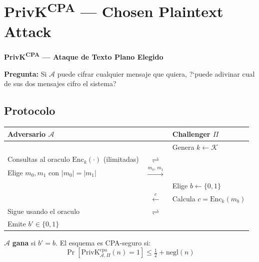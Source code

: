 \documentclass[a4paper,11pt]{article}
\begin{document}
\section{PrivK\textsuperscript{CPA} --- Chosen Plaintext Attack}

\begin{tcolorbox}[
  enhanced, breakable,
  colback=white, colframe=itbaGreen,
  borderline west={3pt}{0pt}{itbaGreen},
  sharp corners, drop shadow,
  top=4mm, left=4mm, right=4mm, bottom=4mm,
]
{\color{itbaGreen}\large\bfseries PrivK\textsuperscript{CPA} --- Ataque de Texto Plano Elegido}\par\vspace{4pt}
\textbf{Pregunta:} Si $\mathcal{A}$ puede cifrar cualquier mensaje que quiera, ?`puede adivinar cual de sus dos mensajes cifro el sistema?
\end{tcolorbox}

\vspace{0.5cm}

\subsection{Protocolo}

\begin{center}
\begin{tabular}{ACB}
\toprule
\textbf{Adversario $\mathcal{A}$} & & \textbf{Challenger $\Pi$} \\
\midrule
 & & Genera $k \leftarrow \mathcal{K}$ \\
Consultas al oraculo $\mathrm{Enc}_k(\cdot)$ (ilimitadas) & $\rightleftharpoons$ & \\
Elige $m_0, m_1$ con $|m_0|=|m_1|$ & $\xrightarrow{m_0,\,m_1}$ & \\
 & & Elige $b \leftarrow \{0,1\}$ \\
 & $\xleftarrow{c}$ & Calcula $c = \mathrm{Enc}_k(m_b)$ \\
Sigue usando el oraculo & $\rightleftharpoons$ & \\
Emite $b' \in \{0,1\}$ & & \\
\bottomrule
\end{tabular}
\end{center}

\vspace{0.3cm}
$\mathcal{A}$ \textbf{gana} si $b' = b$. El esquema es CPA-seguro si:
\[
  \Pr[\text{PrivK}^{\mathrm{cpa}}_{\mathcal{A},\Pi}(n) = 1] \leq \tfrac{1}{2} + \mathrm{negl}(n)
\]
\end{document}
